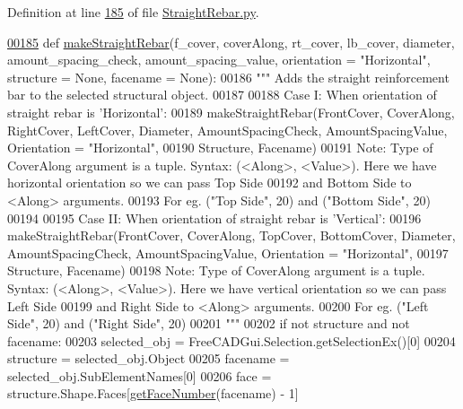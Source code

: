 Definition at line \hyperlink{StraightRebar_8py_source_l00185}{185} of file \hyperlink{StraightRebar_8py_source}{Straight\+Rebar.\+py}.


\begin{DoxyCode}
\hypertarget{namespaceStraightRebar.tex_l00185}{}\hyperlink{namespaceStraightRebar_af6270367d7beae457813e33718d80faf}{00185} \textcolor{keyword}{def }\hyperlink{namespaceStraightRebar_af6270367d7beae457813e33718d80faf}{makeStraightRebar}(f\_cover, coverAlong, rt\_cover, lb\_cover, diameter, 
      amount\_spacing\_check, amount\_spacing\_value, orientation = "Horizontal", structure = None, facename = None):
00186     \textcolor{stringliteral}{""" Adds the straight reinforcement bar to the selected structural object.}
00187 \textcolor{stringliteral}{}
00188 \textcolor{stringliteral}{    Case I: When orientation of straight rebar is 'Horizontal':}
00189 \textcolor{stringliteral}{        makeStraightRebar(FrontCover, CoverAlong, RightCover, LeftCover, Diameter, AmountSpacingCheck,
       AmountSpacingValue, Orientation = "Horizontal",}
00190 \textcolor{stringliteral}{        Structure, Facename)}
00191 \textcolor{stringliteral}{        Note: Type of CoverAlong argument is a tuple. Syntax: (<Along>, <Value>). Here we have horizontal
       orientation so we can pass Top Side}
00192 \textcolor{stringliteral}{        and Bottom Side to <Along> arguments.}
00193 \textcolor{stringliteral}{        For eg. ("Top Side", 20) and ("Bottom Side", 20)}
00194 \textcolor{stringliteral}{}
00195 \textcolor{stringliteral}{    Case II: When orientation of straight rebar is 'Vertical':}
00196 \textcolor{stringliteral}{        makeStraightRebar(FrontCover, CoverAlong, TopCover, BottomCover, Diameter, AmountSpacingCheck,
       AmountSpacingValue, Orientation = "Horizontal",}
00197 \textcolor{stringliteral}{        Structure, Facename)}
00198 \textcolor{stringliteral}{        Note: Type of CoverAlong argument is a tuple. Syntax: (<Along>, <Value>). Here we have vertical
       orientation so we can pass Left Side}
00199 \textcolor{stringliteral}{        and Right Side to <Along> arguments.}
00200 \textcolor{stringliteral}{        For eg. ("Left Side", 20) and ("Right Side", 20)}
00201 \textcolor{stringliteral}{    """}
00202     \textcolor{keywordflow}{if} \textcolor{keywordflow}{not} structure \textcolor{keywordflow}{and} \textcolor{keywordflow}{not} facename:
00203         selected\_obj = FreeCADGui.Selection.getSelectionEx()[0]
00204         structure = selected\_obj.Object
00205         facename = selected\_obj.SubElementNames[0]
00206     face = structure.Shape.Faces[\hyperlink{namespaceRebarfunc_a3885b3b63e3a41508ac79bc7550cf301}{getFaceNumber}(facename) - 1]

\end{DoxyCode}
